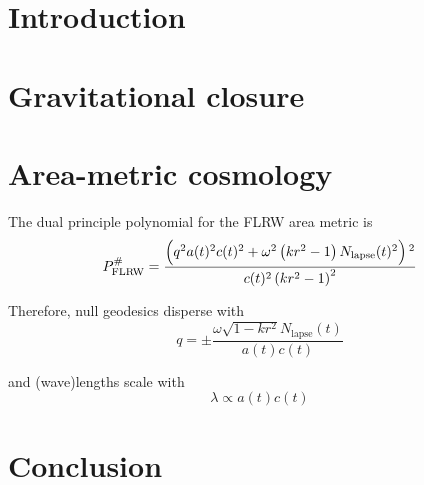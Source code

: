 \chapter{Introduction}\label{ch:intro}

\chapter{Gravitational closure}

\chapter{Area-metric cosmology}

The dual principle polynomial for the FLRW area metric is
\begin{equation}
P^\#_\mathrm{FLRW}=\frac{\left(q^2 a(t)^2 c(t)^2+\omega ^2 \left(k r^2-1\right) N_{\text{lapse}}(t){}^2\right){}^2}{c(t)^2 \left(k r^2-1\right)^2}
\end{equation}

Therefore, null geodesics disperse with
\begin{equation}
q = \pm \frac{\omega  \sqrt{1-k r^2} N_{\text{lapse}}(t)}{a(t) c(t)}
\end{equation}

and (wave)lengths scale with
\begin{equation}
\lambda \propto a(t) c(t)
\end{equation}

\chapter{Conclusion}
